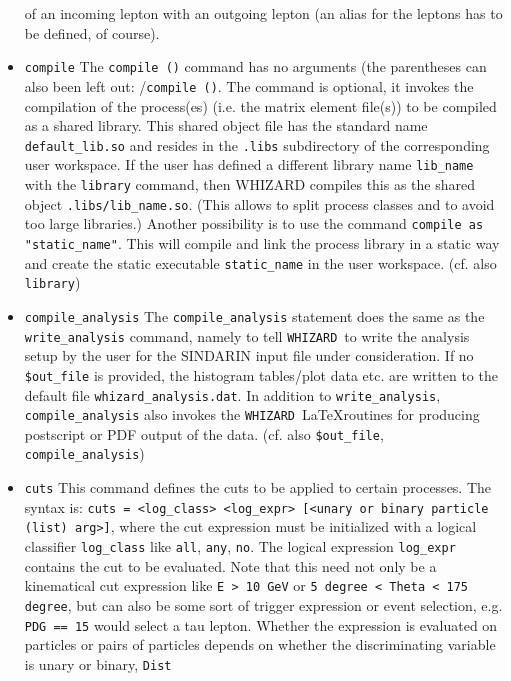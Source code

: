 \documentclass[12pt]{book}
\newcommand{\ttt}[1]{\texttt{#1}}
\newcommand{\whizard}{\texttt{WHIZARD}}
\begin{document}
\begin{itemize}
of an incoming lepton with an outgoing lepton (an alias for the
leptons has to be defined, of course).
\item
\ttt{compile} \newline 
The \ttt{compile ()} command has no arguments (the parentheses can
also been left out: /\ttt{compile ()}. The command is optional, it
invokes the compilation of the process(es) (i.e. the matrix element
file(s)) to be compiled as a shared library. This shared object file
has the standard name \ttt{default\_lib.so} and resides in the
\ttt{.libs} subdirectory of the corresponding user workspace. If the
user has defined a different library name \ttt{lib\_name} with the
\ttt{library} command, then WHIZARD compiles this as the shared object
\ttt{.libs/lib\_name.so}. (This allows to split process classes and to
avoid too large libraries.) 
Another possibility is to use the command \ttt{compile as
  "static\_name"}. This will compile and link the process library in a
static way and create the static executable \ttt{static\_name} in the
user workspace. (cf. also \ttt{library})
\item
\ttt{compile\_analysis} \newline
The \ttt{compile\_analysis} statement does the same as
the \ttt{write\_analysis} command, namely to tell \whizard\ to write
the analysis setup by the user for the SINDARIN input file under 
consideration. If no \ttt{\$out\_file} is provided, the histogram
tables/plot data etc. are written to the default file
\ttt{whizard\_analysis.dat}. In addition to \ttt{write\_analysis}, 
\ttt{compile\_analysis} also invokes the \whizard\ \LaTeX routines for
producing postscript or PDF output of the data.
(cf. also \ttt{\$out\_file}, \ttt{compile\_analysis})
\item
\ttt{cuts} \newline
This command defines the cuts to be applied to certain processes. The
syntax is: \ttt{cuts = <log\_class> <log\_expr> [<unary or binary
  particle (list) arg>]}, where the cut expression must be initialized
with a logical classifier \ttt{log\_class} like \ttt{all}, \ttt{any},
\ttt{no}. The logical expression \ttt{log\_expr} contains the cut to
be evaluated. Note that this need not only be a kinematical cut
expression like \ttt{E > 10  GeV} or \ttt{5 degree < Theta < 175
  degree}, but can also be some sort of trigger expression or event
selection, e.g. \ttt{PDG == 15} would select a tau lepton.  Whether the
expression is evaluated on particles or pairs of particles depends on
whether the discriminating variable is unary or binary, \ttt{Dist}

\end{itemize}
\end{document}
